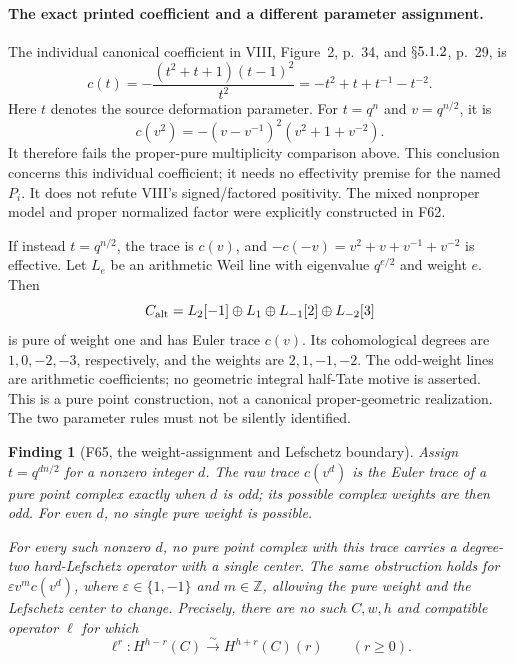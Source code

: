 \documentclass[11pt,a4paper]{article}
\renewcommand{\S}{\ensuremath{\mathsection}}
\newcommand{\fid}[1]{\textsf{#1}}\newcommand{\gate}[1]{\textsf{#1}}
\theoremstyle{named}\newtheorem{finding}{Finding}[section]
\theoremstyle{definition}\newtheorem{definition}[finding]{Definition}
\theoremstyle{remark}\newtheorem{remark}[finding]{Remark}
\begin{document}
\paragraph{The exact printed coefficient and a different parameter assignment.}
The individual canonical coefficient in VIII, Figure~2,
p.~34, and \(\S5.1.2\), p.~29, is
\begin{equation}\label{eq:VIIIrawCanonicalCoefficient}
 c(t)=-\frac{(t^2+t+1)(t-1)^2}{t^2}
           =-t^2+t+t^{-1}-t^{-2}.
\end{equation}
Here \(t\) denotes the source deformation parameter.
For \(t=q^n\) and \(v=q^{n/2}\), it is
\[
                    c(v^2)=-(v-v^{-1})^2(v^2+1+v^{-2}).
\]
It therefore fails the proper-pure multiplicity comparison
above. This conclusion concerns this individual coefficient;
it needs no effectivity premise for the named \(P_i\).
It does not refute VIII's signed/factored positivity.
The mixed nonproper model and proper normalized factor
were explicitly constructed in \fid{F62}.

If instead \(t=q^{n/2}\), the trace is \(c(v)\), and
\(-c(-v)=v^2+v+v^{-1}+v^{-2}\) is effective.
Let \(L_e\) be an arithmetic Weil line with eigenvalue
\(q^{e/2}\) and weight \(e\). Then
\begin{equation}\label{eq:alternatePureVIIIcoefficient}
 C_{\rm alt}=L_2[-1]\oplus L_1
                      \oplus L_{-1}[2]\oplus L_{-2}[3]
\end{equation}
is pure of weight one and has Euler trace \(c(v)\).
Its cohomological degrees are \(1,0,-2,-3\), respectively,
and the weights are \(2,1,-1,-2\).
The odd-weight lines are arithmetic coefficients; no
geometric integral half-Tate motive is asserted.
This is a pure point construction, not a canonical
proper-geometric realization. The two parameter rules
must not be silently identified.

\begin{finding}[\fid{F65}, the weight-assignment and Lefschetz boundary]
\label{f:canonicalLefschetzBoundary}
Assign \(t=q^{dn/2}\) for a nonzero integer \(d\).
The raw trace \(c(v^d)\) is the Euler trace of a pure
point complex exactly when \(d\) is odd; its possible
complex weights are then odd. For even \(d\), no
single pure weight is possible.

For every such nonzero \(d\), no pure point complex
with this trace carries a degree-two hard-Lefschetz
operator with a single center. The same obstruction
holds for \(\varepsilon v^m c(v^d)\), where
\(\varepsilon\in\{1,-1\}\) and \(m\in\mathbb Z\),
allowing the pure weight and the Lefschetz center to change.
Precisely, there are no such \(C,w,h\) and compatible
operator \(\ell\) for which
\[
 \ell^r:H^{h-r}(C)\xrightarrow{\sim}H^{h+r}(C)(r)
                       \qquad(r\geq0).
\]
\end{finding}
\end{document}
